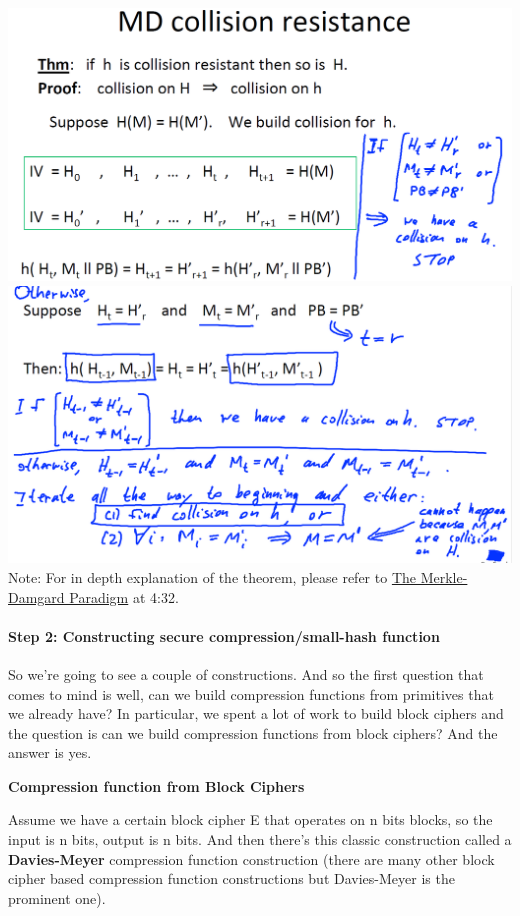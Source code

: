 \documentclass[11pt]{article}
\makeatletter
\def\maxwidth{\ifdim\Gin@nat@width>\linewidth\linewidth
    \else\Gin@nat@width\fi}
\let\Oldincludegraphics\includegraphics
\renewcommand{\includegraphics}[1]{\Oldincludegraphics[width=.8\maxwidth]{#1}}
\makeatother
\begin{document}
\includegraphics{./Images/MD-Theorem.png}
\includegraphics{./Images/MD-Theorem-cont.png} Note: For in depth
explanation of the theorem, please refer to
\href{https://www.coursera.org/learn/crypto/lecture/Hfnu9/the-merkle-damgard-paradigm}{The
Merkle-Damgard Paradigm} at 4:32.

\hypertarget{step-2-constructing-secure-compressionsmall-hash-function}{%
\paragraph{Step 2: Constructing secure compression/small-hash
function}\label{step-2-constructing-secure-compressionsmall-hash-function}}

So we're going to see a couple of constructions. And so the first
question that comes to mind is well, can we build compression functions
from primitives that we already have? In particular, we spent a lot of
work to build block ciphers and the question is can we build compression
functions from block ciphers? And the answer is yes.

\textbf{Compression function from Block Ciphers}

Assume we have a certain block cipher E that operates on n bits blocks,
so the input is n bits, output is n bits. And then there's this classic
construction called a \textbf{Davies-Meyer} compression function
construction (there are many other block cipher based compression
function constructions but Davies-Meyer is the prominent one).
\end{document}
